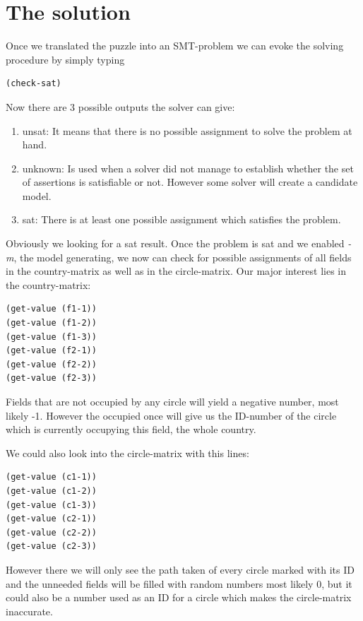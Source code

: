 \section{The solution}
Once we translated the puzzle into an SMT-problem we can evoke the solving procedure by simply typing
\begin{lstlisting}
(check-sat)
\end{lstlisting}
Now there are 3 possible outputs the solver can give:
\begin{enumerate}
  \item unsat: It means that there is no possible assignment to solve the problem at hand.
  \item unknown: Is used when a solver did not manage to establish whether the set of assertions is satisfiable or not. However some solver will create a candidate model.
  \item sat: There is at least one possible assignment which satisfies the problem.
\end{enumerate}
Obviously we looking for a sat result. Once the problem is sat and we enabled \emph{-m}, the model generating, we now can check for possible assignments of all fields in the country-matrix as well as in the circle-matrix. Our major interest lies in the country-matrix:
\begin{lstlisting}
(get-value (f1-1))
(get-value (f1-2))
(get-value (f1-3))
(get-value (f2-1))
(get-value (f2-2))
(get-value (f2-3))
\end{lstlisting}
Fields that are not occupied by any circle will yield a negative number, most likely -1. However the occupied once will give us the ID-number of the circle which is currently occupying this field, the whole country.

We could also look into the circle-matrix with this lines:
\begin{lstlisting}
(get-value (c1-1))
(get-value (c1-2))
(get-value (c1-3))
(get-value (c2-1))
(get-value (c2-2))
(get-value (c2-3))
\end{lstlisting}
However there we will only see the path taken of every circle marked with its ID and the unneeded fields will be filled with random numbers most likely 0, but it could also be a number used as an ID for a circle which makes the circle-matrix inaccurate.

